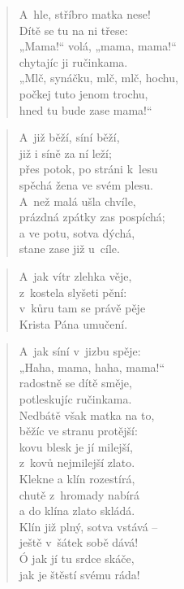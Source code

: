 \begin{verse}
A~hle, stříbro matka nese! \\
Dítě se tu na ni třese: \\
„Mama!“ volá, „mama, mama!“ \\
chytajíc ji ručinkama. \\
„Mlč, synáčku, mlč, mlč, hochu, \\
počkej tuto jenom trochu, \\
hned tu bude zase mama!“
\end{verse}

\begin{verse}
A~již běží, síní běží, \\
již i síně za ní leží; \\
přes potok, po stráni k~lesu \\
spěchá žena ve svém plesu. \\
A~než malá ušla chvíle, \\
prázdná zpátky zas pospíchá; \\
a ve potu, sotva dýchá, \\
stane zase již u~cíle.
\end{verse}

\begin{verse}
A~jak vítr zlehka věje, \\
z~kostela slyšeti pění: \\
v~kůru tam se právě pěje \\
Krista Pána umučení.
\end{verse}

\begin{verse}
A~jak síní v~jizbu spěje: \\
„Haha, mama, haha, mama!“ \\
radostně se dítě směje, \\
potleskujíc ručinkama. \\
Nedbátě však matka na to, \\
běžíc ve stranu protější: \\
kovu blesk je jí milejší, \\
z~kovů nejmilejší zlato. \\
Klekne a klín rozestírá, \\
chutě z~hromady nabírá \\
a do klína zlato skládá. \\
Klín již plný, sotva vstává -- \\
ještě v~šátek sobě dává! \\
Ó jak jí tu srdce skáče, \\
jak je štěstí svému ráda!
\end{verse}

